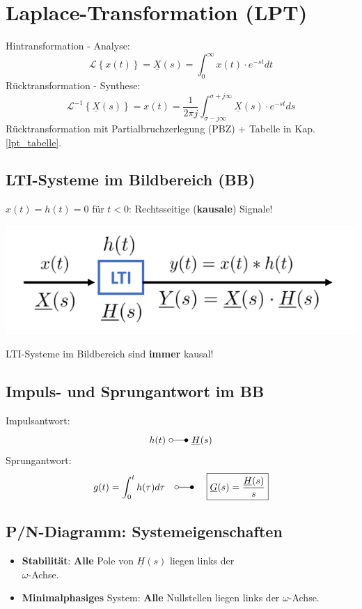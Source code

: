 \section{Laplace-Transformation (LPT)}
	Hintransformation - Analyse:
	\[
		 \mathcal{L}\left\{ x(t) \right\} = \boxed{ \underline{X}(s) = \int_0^\infty x(t) \cdot e^{-st} dt }
	\]
	Rücktransformation - Synthese:
	\[
		 \mathcal{L}^{-1}\left\{ \underline{X}(s) \right\} = x(t) =  \frac{1}{2\pi j}\int_{\sigma-j\infty}^{\sigma+j\infty} \underline{X}(s) \cdot e^{-st} ds
	\]
Rücktransformation mit Partialbruchzerlegung (PBZ) + Tabelle in Kap. \ref{lpt_tabelle}.

\normalsize
\subsection{LTI-Systeme im Bildbereich (BB)}
$x(t)=h(t)=0$ für $t<0$: Rechtsseitige (\textbf{kausale}) Signale!
\begin{center}
	\includegraphics[width=0.6\columnwidth]{Bilder/LTI_Systeme_im_Bildbereich.png}
\end{center}
LTI-Systeme im Bildbereich sind \textbf{immer} kausal!

\subsection{Impuls- und Sprungantwort im BB}
Impulsantwort:
\[
h(t)\ \laplace\ \underline{H}(s)
\]
Sprungantwort:
\[
g(t) = \int_0^t h(\tau) d\tau \quad \laplace\ \quad \boxed{\underline{G}(s) = \frac{\underline{H}(s)}{s}}
\]

\subsection{P/N-Diagramm: Systemeigenschaften}\label{pn_diagramm_lpt}
\begin{itemize}
	\item \textbf{Stabilität}: \textbf{Alle} Pole von $\underline{H}(s)$ liegen links der\\ $\omega$-Achse.
	\item \textbf{Minimalphasiges} System: \textbf{Alle} Nullstellen liegen links der $\omega$-Achse.
\end{itemize}

